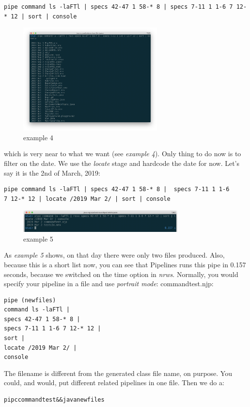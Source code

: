 \begin{lstlisting}
pipe command ls -laFTl | specs 42-47 1 58-* 8 | specs 7-11 1 1-6 7 12-* 12 | sort | console
\end{lstlisting}
\begin{figure}[h]
  \includegraphics[width=0.65\textwidth]{images/example4.png}
  \caption{example 4}
  \label{fig:example4}
\end{figure}
which is very near to what we want (see \emph{example 4}). Only thing to do now is to filter
on the date. We use the \emph{locate} stage and hardcode the date for
now. Let's say it is the 2nd of March, 2019:
\begin{lstlisting}
pipe command ls -laFTl | specs 42-47 1 58-* 8 |  specs 7-11 1 1-6
7 12-* 12 | locate /2019 Mar 2/ | sort | console
\end{lstlisting}
\begin{figure}[h]
  \includegraphics[width=0.75\textwidth]{images/example5.png}
  \caption{example 5}
  \label{fig:example5}
\end{figure}
As \emph{example 5} shows, on that day there were only two files
produced. Also, because this is a short list now, you can see that
Pipelines runs this pipe in 0.157 seconds, because we switched on the
time option in \emph{nrws}.
Normally, you would specify your pipeline in a file and use
\emph{portrait mode}:
commandtest.njp:
\begin{lstlisting}
pipe (newfiles)
command ls -laFTl |
specs 42-47 1 58-* 8 |
specs 7-11 1 1-6 7 12-* 12 |
sort |
locate /2019 Mar 2/ |
console
\end{lstlisting}
The filename is different from the generated class file name, on purpose. You could, and would, put different related pipelines in one file.
Then we do a:
\begin{alltt}
pipc commandtest && java newfiles
\end{alltt}


